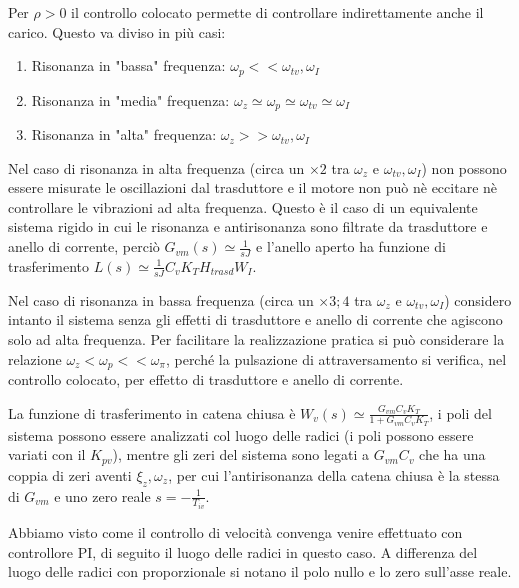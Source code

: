 Per \(\rho > 0\) il controllo colocato permette di controllare indirettamente anche il carico.
Questo va diviso in più casi:
\begin{enumerate}
    \item Risonanza in "bassa" frequenza: \(\omega_p << \omega_{tv}, \omega_I\)
    \item Risonanza in "media" frequenza: \(\omega_z \simeq \omega_p \simeq \omega_{tv} \simeq \omega_I\)
    \item Risonanza in "alta" frequenza: \(\omega_z >> \omega_{tv}, \omega_I\)
\end{enumerate} 

Nel caso di risonanza in alta frequenza (circa un \(\times 2\) tra \(\omega_z\) e \(\omega_{tv},\omega_I\)) non possono essere misurate le oscillazioni dal trasduttore e il motore non può nè eccitare nè controllare le vibrazioni ad alta frequenza. Questo è il caso di un equivalente sistema rigido in cui le risonanza e antirisonanza sono filtrate da trasduttore e anello di corrente, perciò \(G_{vm}(s) \simeq \frac{1}{sJ}\) e l'anello aperto ha funzione di trasferimento \(L(s) \simeq \frac{1}{sJ} C_v K_T H_{trasd} W_I\).

Nel caso di risonanza in bassa frequenza (circa un \(\times 3;4\) tra \(\omega_z\) e \(\omega_{tv}, \omega_I\)) considero intanto il sistema senza gli effetti di trasduttore e anello di corrente che agiscono solo ad alta frequenza.
Per facilitare la realizzazione pratica si può considerare la relazione \(\omega_z < \omega_p << \omega_\pi\), perché la pulsazione di attraversamento si verifica, nel controllo colocato, per effetto di trasduttore e anello di corrente.

La funzione di trasferimento in catena chiusa è \(W_v(s) \simeq \frac{G_{vm}C_v K_T}{1+G_{vm}C_v K_T}\), i poli del sistema possono essere analizzati col luogo delle radici (i poli possono essere variati con il \(K_{pv}\)), mentre gli zeri del sistema sono legati a \(G_{vm}C_v\) che ha una coppia di zeri aventi \(\xi_z, \omega_z\), per cui l'antirisonanza della catena chiusa è la stessa di \(G_{vm}\) e uno zero reale \(s=-\frac{1}{T_{iv}}\).

Abbiamo visto come il controllo di velocità convenga venire effettuato con controllore PI, di seguito il luogo delle radici in questo caso. A differenza del luogo delle radici con proporzionale si notano il polo nullo e lo zero sull'asse reale.

